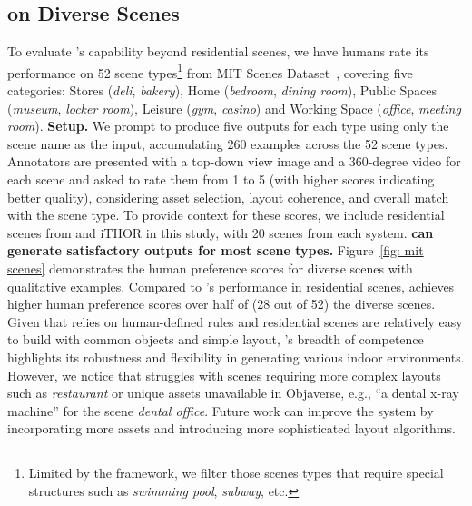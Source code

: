 \subsection{\textbf{\holodeck} on Diverse Scenes}
To evaluate \holodeck's capability beyond residential scenes, we have humans rate its performance on 52 scene types\footnote{Limited by the \procthor framework, we filter those scenes types that require special structures such as \textit{swimming pool}, \textit{subway}, etc.} from MIT Scenes Dataset~\cite{quattoni2009recognizing}, covering five categories: Stores (\textit{deli}, \textit{bakery}), Home (\textit{bedroom}, \textit{dining room}), Public Spaces (\textit{museum}, \textit{locker room}), Leisure (\textit{gym}, \textit{casino}) and Working Space (\textit{office}, \textit{meeting room}).
\smallbreak
\noindent \textbf{Setup.} We prompt \holodeck to produce five outputs for each type using only the scene name as the input, accumulating 260 examples across the 52 scene types. Annotators are presented with a top-down view image and a 360-degree video for each scene and asked to rate them from 1 to 5 (with higher scores indicating better quality), considering asset selection, layout coherence, and overall match with the scene type. To provide context for these scores, we include residential scenes from \procthor and iTHOR in this study, with 20 scenes from each system.
\smallbreak
\noindent \textbf{\holodeck can generate satisfactory outputs for most scene types.}
Figure~\ref{fig: mit scenes} demonstrates the human preference scores for diverse scenes with qualitative examples. Compared to \procthor's performance in residential scenes, \holodeck achieves higher human preference scores over half of (28 out of 52) the diverse scenes. Given that \procthor relies on human-defined rules and residential scenes are relatively easy to build with common objects and simple layout, \holodeck's breadth of competence highlights its robustness and flexibility in generating various indoor environments. However, we notice that \holodeck struggles with scenes requiring more complex layouts such as \textit{restaurant} or unique assets unavailable in Objaverse, e.g., ``a dental x-ray machine'' for the scene \textit{dental office}.
Future work can improve the system by incorporating more assets and introducing more sophisticated layout algorithms.
